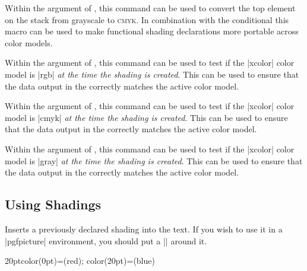 \begin{command}{\pgffuncshadinggraytocmyk}
  Within the  argument of
  , this command can be used to convert the
  top element on the stack from grayscale to \textsc{cmyk}. In combination
  with the  conditional this macro can be used to
  make functional shading declarations more portable across color models.
\end{command}

{\let\ifpgfshadingmodelrgb=\relax
 \let\ifpgfshadingmodelcmyk=\relax
 \let\ifpgfshadingmodelgray=\relax
 \begin{command}{\ifpgfshadingmodelrgb}
   Within the  argument of
   , this command can be used to test if the
   |xcolor| color model is |rgb| \emph{at the time the shading is created}.
   This can be used to ensure that the data output in the  correctly matches the active color model.
 \end{command}

 \begin{command}{\ifpgfshadingmodelcmyk}
   Within the  argument of
   , this command can be used to test if the
   |xcolor| color model is |cmyk| \emph{at the time the shading is created}.
   This can be used to ensure that the data output in the  correctly matches the active color model.
 \end{command}

 \begin{command}{\ifpgfshadingmodelgray}
   Within the  argument of
   , this command can be used to test if the
   |xcolor| color model is |gray| \emph{at the time the shading is created}.
   This can be used to ensure that the data output in the  correctly matches the active color model.
 \end{command}
}

\subsection{Using Shadings}
\label{section-shading-a-path}

\begin{command}{\pgfuseshading{}}
    Inserts a previously declared shading into the text. If you wish to use it
    in a |pgfpicture| environment, you should put a |\pgftext| around it.
\begin{codeexample}[]
\begin{pgfpicture}
    {20pt}{color(0pt)=(red); color(20pt)=(blue)}
\end{pgfpicture}
\end{codeexample}
\end{command}

